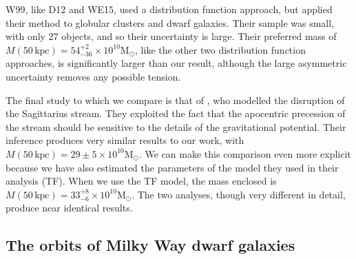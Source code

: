 \documentclass[useAMS,twocolumn,usenatbib]{mn2e}
\def\kpc{{\,\mathrm{kpc}}}
\begin{document}
W99, like D12 and WE15, used a distribution function approach, but
applied their method to globular clusters and dwarf galaxies. Their
sample was small, with only 27 objects, and so their uncertainty is
large. Their preferred mass of $M(50\kpc)=54^{+2}_{-36}\times
10^{10}\mathrm{M}_\odot$, like the other two distribution function
approaches, is significantly larger than our result, although the
large asymmetric uncertainty removes any possible tension.

The final study to which we compare is that of \citet[][G14]{Gi14},
who modelled the disruption of the Sagittarius stream. They exploited
the fact that the apocentric precession of the stream should be
sensitive to the details of the gravitational potential. Their
inference produces very similar results to our work, with
$M(50\kpc)=29\pm5\times 10^{10}\mathrm{M}_\odot$. We can make this
comparison even more explicit because we have also estimated the
parameters of the model they used in their analysis (TF). When we use
the TF model, the mass enclosed is $M(50\kpc)=33^{+8}_{-6}\times
10^{10}\mathrm{M}_\odot$. The two analyses, though very different in
detail, produce near identical results.

\subsection{The orbits of Milky Way dwarf galaxies}
\end{document}
